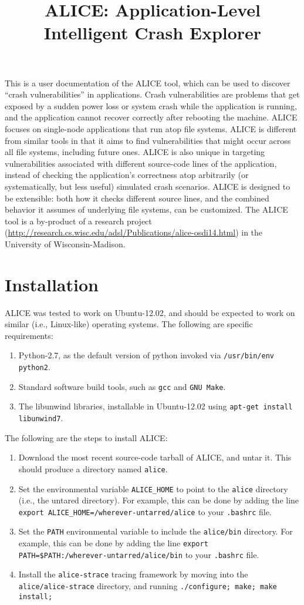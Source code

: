 \documentclass[oneside]{memoir}
\begin{document}
\title{ALICE: Application-Level Intelligent Crash Explorer}
\date{}
\maketitle

This is a user documentation of the ALICE tool, which can be used to discover ``crash vulnerabilities'' in applications. Crash vulnerabilities are problems that get exposed by a sudden power loss or system crash while the application is running, and the application cannot recover correctly after rebooting the machine. ALICE focuses on single-node applications that run atop file systems. ALICE is different from similar tools in that it aims to find vulnerabilities that might occur across all file systems, including future ones. ALICE is also unique in targeting vulnerabilities associated with different source-code lines of the application, instead of checking the application's correctness atop arbitrarily (or systematically, but less useful) simulated crash scenarios. ALICE is designed to be extensible: both how it checks different source lines, and the combined behavior it assumes of underlying file systems, can be customized. The ALICE tool is a by-product of a research project (\url{http://research.cs.wisc.edu/adsl/Publications/alice-osdi14.html}) in the University of Wisconsin-Madison.

\chapter{Installation}
ALICE was tested to work on Ubuntu-12.02, and should be expected to work on similar (i.e., Linux-like) operating systems. The following are specific requirements:
\begin{enumerate}
\item Python-2.7, as the default version of python invoked via \verb;/usr/bin/env python2;.
\item Standard software build tools, such as \verb;gcc; and \verb;GNU Make;.
\item The libunwind libraries, installable in Ubuntu-12.02 using \verb;apt-get install libunwind7;.
\end{enumerate}
The following are the steps to install ALICE:
\begin{enumerate}
\item Download the most recent source-code tarball of ALICE, and untar it. This should produce a directory named \verb;alice;.
\item Set the environmental variable \verb;ALICE_HOME; to point to the \verb;alice; directory (i.e., the untared directory). For example, this can be done by adding the line \verb;export ALICE_HOME=/wherever-untarred/alice; to your \verb;.bashrc; file.
\item Set the \verb;PATH; environmental variable to include the \verb;alice/bin; directory. For example, this can be done by adding the line \verb;export PATH=$PATH:;\discretionary{}{}{}\verb;/wherever-untarred/alice/bin; to your \verb;.bashrc; file.
\item Install the \verb;alice-strace; tracing framework by moving into the \verb;alice/alice-strace; directory, and running \verb+./configure; make; make install;+
\end{enumerate}
\end{document}
